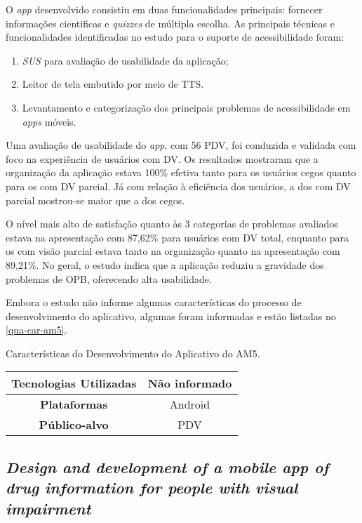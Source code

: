 O \emph{app} desenvolvido consistiu em duas funcionalidades principais: fornecer informações cientificas e \emph{quizzes} de múltipla escolha.
As principais técnicas e funcionalidades identificadas no estudo para o suporte de acessibilidade foram:

\begin{enumerate}
  \item \emph{SUS} para avaliação de usabilidade da aplicação;
  \item Leitor de tela embutido por meio de TTS\@.
  \item Levantamento e categorização dos principais problemas de acessibilidade em \emph{apps} móveis.
\end{enumerate}

Uma avaliação de usabilidade do \emph{app}, com 56 PDV, foi conduzida e validada com foco na experiência de usuários com DV\@.
Os resultados mostraram que a organização da aplicação estava 100\% efetiva tanto para os usuários cegos quanto para os com DV parcial.
Já com relação à eficiência dos usuários, a dos com DV parcial mostrou-se maior que a dos cegos.

O nível mais alto de satisfação quanto às 3 categorias de problemas avaliados estava na apresentação com
87,62\% para usuários com DV total, enquanto para os com visão parcial estava tanto na organização quanto
na apresentação com 89,21\%.
No geral, o estudo indica que a aplicação reduziu a gravidade dos problemas de OPB, oferecendo alta usabilidade.

Embora o estudo não informe algumas características do processo de desenvolvimento do aplicativo, algumas foram
informadas e estão listadas no \autoref{qua-car-am5}.

\begin{quadro}[htb!]
  \caption{\label{qua-car-am5}Características do Desenvolvimento do Aplicativo do AM5.}
  \begin{tabular}{|c|c|}
    \hline
    \textbf{Tecnologias Utilizadas} & Não informado \\ \hline
    \textbf{Plataformas}            & Android       \\ \hline
    \textbf{Público-alvo}           & PDV           \\
    \hline
  \end{tabular}
\end{quadro}

\subsection{\emph{Design and development of a mobile app of drug information for people with visual impairment}}

